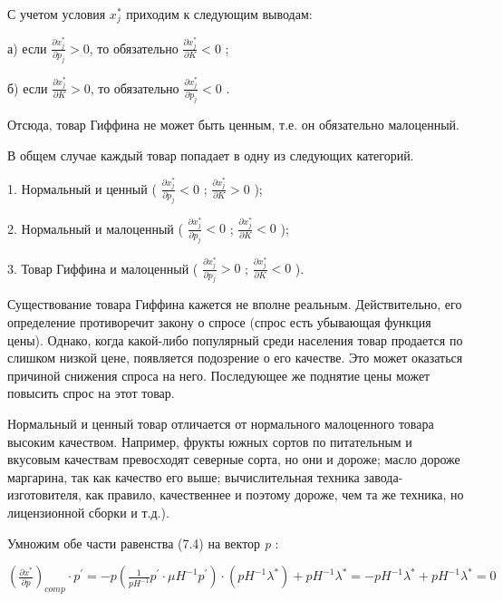 \documentclass[12pt, 4paper]{book}
\begin{document}
{С учетом условия $x_{j}^{*}$ приходим к следующим выводам: 
\par

а) если  $\frac{\partial x_{j}^{*}}{\partial p_j} >0$, то обязательно $\frac{\partial x_{j}^{*}}{\partial K} <0$ ; 
\par

б) если $\frac{\partial x_{j}^{*}}{\partial K} >0$, то обязательно $\frac{\partial x_{j}^{*}}{\partial p_j} <0$ .
\par

Отсюда, товар Гиффина не может быть ценным, т.е. он обязательно малоценный. 
\par

В общем случае каждый товар попадает в одну из следующих категорий. 
\par

1.	Нормальный и ценный (  $\frac{\partial x_{j}^{*}}{\partial p_j} <0$ ; $\frac{\partial x_{j}^{*}}{\partial K} >0$ ); 
\par

2.	Нормальный и малоценный (  $\frac{\partial x_{j}^{*}}{\partial p_j} <0$ ; $\frac{\partial x_{j}^{*}}{\partial K} <0$  ); 
\par

3.	Товар Гиффина и малоценный (  $\frac{\partial x_{j}^{*}}{\partial p_j} > 0$ ; $\frac{\partial x_{j}^{*}}{\partial K} <0$   ).
\par

Существование товара Гиффина кажется не вполне реальным. Действительно, его определение противоречит закону о спросе (спрос есть убывающая функция цены). Однако, когда какой-либо популярный среди населения товар продается по слишком низкой цене, появляется подозрение о его качестве. Это может оказаться причиной снижения спроса на него. Последующее же поднятие цены может повысить спрос на этот товар. 
\par

Нормальный и ценный товар отличается от нормального малоценного товара высоким качеством. Например, фрукты южных сортов по питательным и вкусовым качествам превосходят северные сорта, но они и дороже; масло дороже маргарина, так как качество его выше; вычислительная техника завода-изготовителя, как правило, качественнее и поэтому дороже, чем та же техника, но лицензионной сборки и т.д.).
\par

Умножим обе части равенства (7.4) на вектор \textit{p} :
\begin{center}
$(\frac{\partial x^{*}}{\partial p})_{comp}\cdot p^{'} = -p(\frac{1}{p H^{-1}}p^{'}\cdot \mu H^{-1} p^{'})\cdot (pH^{-1}\lambda^{*})+pH^{-1}\lambda^{*}=-pH^{-1}\lambda^{*}+pH^{-1}\lambda^{*} = 0$
\end{center}
\par

}
\end{document}
